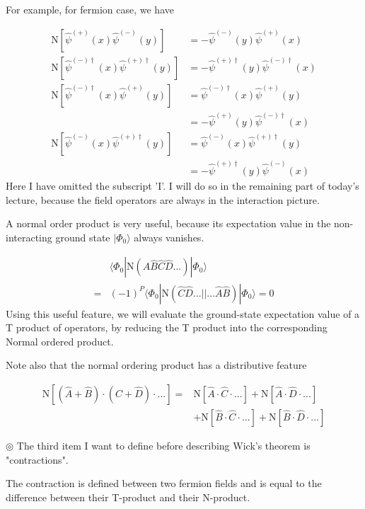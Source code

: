 For example, for fermion case, we have 

\begin{align}
\mathrm{N}[\hat \psi^{(+)}(x)\hat \psi^{(-)}(y)]&=-\hat \psi^{(-)}(y)\hat \psi^{(+)}(x) \nonumber \\
\mathrm{N}[\hat \psi^{(-)\dagger}(x)\hat \psi^{(+)\dagger}(y)]&=-\hat \psi^{(+)\dagger}(y)\hat \psi^{(-)\dagger}(x) \nonumber \\
\mathrm{N}[\hat \psi^{(-)\dagger}(x)\hat \psi^{(+)}(y)]&=\hat \psi^{(-)\dagger}(x)\hat \psi^{(+)}(y) \nonumber \\
&=-\hat \psi^{(+)}(y)\hat \psi^{(-)\dagger}(x) \nonumber \\
\mathrm{N}[\hat \psi^{(-)}(x)\hat \psi^{(+)\dagger}(y)]&=\hat \psi^{(-)}(x)\hat \psi^{(+)\dagger}(y) \nonumber \\
&=-\hat \psi^{(+)\dagger}(y)\hat \psi^{(-)}(x) \nonumber 
\end{align}
Here I have omitted the subscript 'I'. I will do so in the remaining part of today's lecture, because the field operators are always in the interaction picture.

A normal order product is very useful, because its expectation value in the non-interacting ground state $|\Phi_0\rangle$ always vanishes.

\begin{align}
&\langle\Phi_0|\mathrm{N}(\hat{A}\hat{B}\hat{C}\hat{D}...)|\Phi_0\rangle \nonumber \\
=&(-1)^P\langle\Phi_0|\mathrm{N}(\hat{C}\hat{D}...||...\hat{A}\hat{B})|\Phi_0\rangle=0 \nonumber
\end{align}
Using this useful feature, we will evaluate the ground-state expectation value of a T product of operators, by reducing the T product into the corresponding Normal ordered product.

Note also that the normal ordering product has a distributive feature

\begin{align}
\mathrm{N}[(\hat{A}+\hat{B})\cdot(\hat{C}+\hat{D})\cdot...]=&\mathrm{N}[\hat{A}\cdot\hat{C}\cdot...]+\mathrm{N}[\hat{A}\cdot\hat{D}\cdot...] \nonumber \\
&+\mathrm{N}[\hat{B}\cdot\hat{C}\cdot...]+\mathrm{N}[\hat{B}\cdot\hat{D}\cdot...] \nonumber
\end{align}

$\circledcirc$ The third item I want to define before describing Wick's theorem is "contractions". 


The contraction is defined between two fermion fields and is equal to the difference between their T-product and their N-product.

